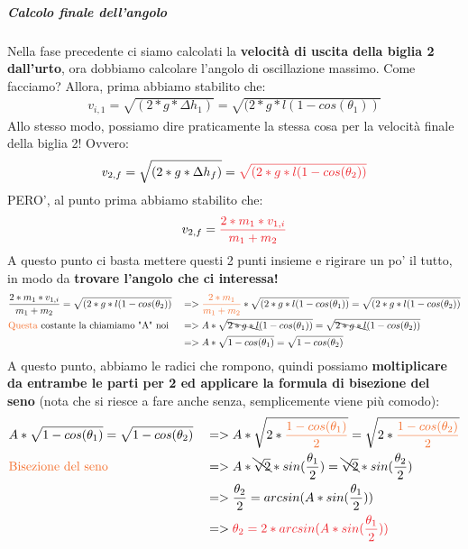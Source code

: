                 \subparagraph{Calcolo finale dell'angolo}
                    Nella fase precedente ci siamo calcolati la \textbf{velocità di uscita della biglia 2 dall'urto}, ora dobbiamo calcolare l'angolo di oscillazione massimo. Come facciamo? Allora, prima abbiamo stabilito che:
                    \begin{align*}
                          v_{i, 1}=\sqrt{(2*g*\Delta h_1)}=\sqrt{(2*g*l(1-cos(\theta_1))}
                    \end{align*}
                    Allo stesso modo, possiamo dire praticamente la stessa cosa per la velocità finale della biglia 2! Ovvero:
                    \begin{align*}
                          v_{2, f}=\sqrt{(2*g*\Delta h_f)}=\textcolor{Red}{\sqrt{(2*g*l(1-cos(\theta_2))}}
                    \end{align*}
                    PERO', al punto prima abbiamo stabilito che:
                    \begin{align*}
                        v_{2, f} = \textcolor{Red}{\frac{2*m_1*v_{1, i}}{m_1+m_2}}
                    \end{align*}
                    A questo punto ci basta mettere questi 2 punti insieme e rigirare un po' il tutto, in modo da \textbf{trovare l'angolo che ci interessa!}
                    \begin{align*}
                        &\frac{2*m_1*v_{1, i}}{m_1+m_2}=\sqrt{(2*g*l(1-cos(\theta_2))}&&=>
                        \textcolor{Orange}{\frac{2*m_1}{m_1+m_2}}*\sqrt{(2*g*l(1-cos(\theta_1))}=\sqrt{(2*g*l(1-cos(\theta_2))}\\
                        &\textrm{\textcolor{Orange}{Questa} costante la chiamiamo "A" noi}&&=>
                        A*\sqrt{\bcancel{2*g*l}(1-cos(\theta_1))}=\sqrt{\bcancel{2*g*l}(1-cos(\theta_2 ))}\\
                        &&&=>
                        A*\sqrt{1-cos(\theta_1)}=\sqrt{1-cos(\theta_2)}\\
                    \end{align*}
                    A questo punto, abbiamo le radici che rompono, quindi possiamo \textbf{moltiplicare da entrambe le parti per 2 ed applicare la formula di bisezione del seno} (nota che si riesce a fare anche senza, semplicemente viene più comodo):
                    \begin{align*}
                        & A*\sqrt{1-cos(\theta_1)}=\sqrt{1-cos(\theta_2)} &&=>
                        A*\sqrt{2*\textcolor{Orange}{\frac{1-cos(\theta_1)}{2}}}=\sqrt{2*\textcolor{Orange}{\frac{1-cos(\theta_2)}{2}}}\\
                        & \textrm{\textcolor{Orange}{Bisezione del seno}} &&=>
                        A*\bcancel{\sqrt{2}}*sin(\frac{\theta_1}{2})=\bcancel{\sqrt{2}}*sin(\frac{\theta_2}{2})\\
                        & &&=>\frac{\theta_2}{2} = arcsin(A*sin(\frac{\theta_1}{2}))\\
                        & &&=>\textcolor{Red}{\theta_2 = 2*arcsin(A*sin(\frac{\theta_1}{2}))}\\
                    \end{align*}
